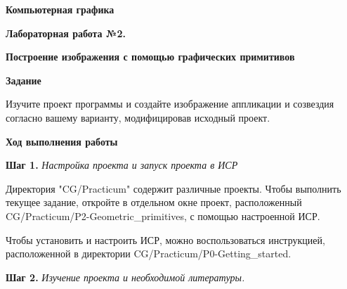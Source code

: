 \documentclass[a4paper,12pt]{article}
\begin{document}
\fontsize{14pt}{16pt}\selectfont
\begin{center}
    \textbf{{\Large Компьютерная графика}}
    
    \textbf{{\large Лабораторная работа №2. }}
    
    \textbf{{\large Построение изображения с помощью графических примитивов}}
    \end{center}
    
    
    \textbf{Задание}
    
    Изучите проект программы и создайте изображение аппликации и созвездия согласно вашему варианту, модифицировав исходный проект.
    
    
    
    \textbf{Ход выполнения работы}
    
    \textbf{Шаг 1.} \textit{Настройка проекта и запуск проекта в ИСР}
    
    Директория "CG/Practicum" содержит различные проекты. Чтобы выполнить текущее задание, откройте в отдельном окне проект, расположенный \textquotedbl CG/Practicum/P2-Geometric\_primitives\textquotedbl, с помощью настроенной ИСР.

    Чтобы установить и настроить ИСР, можно воспользоваться инструкцией, расположенной в директории 
    \textquotedbl CG/Practicum/P0-Getting\_started\textquotedbl .



    
    
    
    \textbf{Шаг 2.} \textit{Изучение проекта и необходимой литературы.}
    
\end{document}

